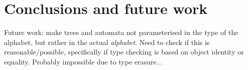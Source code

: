 \section{Conclusions and future work}


Future work: make trees and automata not parameterised in the type of the
alphabet, but rather in the actual \emph{alphabet}. Need to check if this
is reasonable/possible, specifically if type checking is based on object
identity or equality. Probably impossible due to type erasure...



